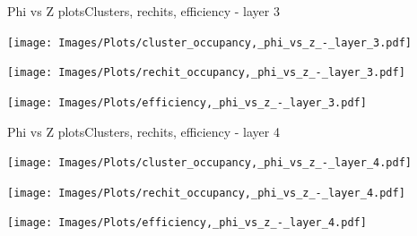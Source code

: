\documentclass{beamer}
\begin{document}
\begin{frame}{Phi vs Z plots}{Clusters, rechits, efficiency - layer 3}
  \hspace{0.01\textwidth}%
  \begin{minipage}{0.32\textwidth}
    \centering
    \texttt{[image: Images/Plots/cluster\_occupancy,\_phi\_vs\_z\_-\_layer\_3.pdf]}
  \end{minipage}%
  \hspace{0.01\textwidth}%
  \begin{minipage}{0.32\textwidth}
    \centering
    \texttt{[image: Images/Plots/rechit\_occupancy,\_phi\_vs\_z\_-\_layer\_3.pdf]}
  \end{minipage}
  \vspace*{0.2cm}
  \begin{minipage}{0.32\textwidth}
    \centering
    \texttt{[image: Images/Plots/efficiency,\_phi\_vs\_z\_-\_layer\_3.pdf]}
  \end{minipage}%
\end{frame}

\begin{frame}{Phi vs Z plots}{Clusters, rechits, efficiency - layer 4}
  \hspace{0.01\textwidth}%
  \begin{minipage}{0.32\textwidth}
    \centering
    \texttt{[image: Images/Plots/cluster\_occupancy,\_phi\_vs\_z\_-\_layer\_4.pdf]}
  \end{minipage}%
  \hspace{0.01\textwidth}%
  \begin{minipage}{0.32\textwidth}
    \centering
    \texttt{[image: Images/Plots/rechit\_occupancy,\_phi\_vs\_z\_-\_layer\_4.pdf]}
  \end{minipage}
  \vspace*{0.2cm}
  \begin{minipage}{0.32\textwidth}
    \centering
    \texttt{[image: Images/Plots/efficiency,\_phi\_vs\_z\_-\_layer\_4.pdf]}
  \end{minipage}%
\end{frame}
\end{document}
